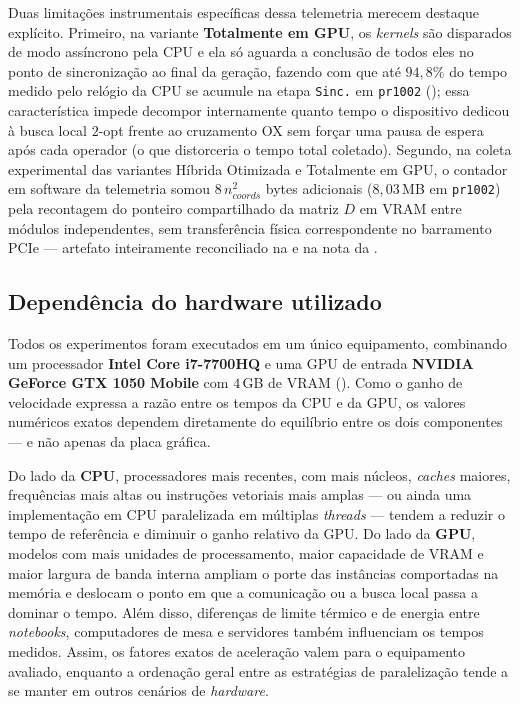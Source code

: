 Duas limitações instrumentais específicas dessa telemetria merecem destaque explícito.
Primeiro, na variante \textbf{Totalmente em GPU}, os \emph{kernels} são disparados de modo assíncrono pela CPU e ela só aguarda a conclusão de todos eles no ponto de sincronização ao final da geração, fazendo com que até \(94{,}8\%\) do tempo medido pelo relógio da CPU se acumule na etapa \texttt{Sinc.} em \texttt{pr1002} (); essa característica impede decompor internamente quanto tempo o dispositivo dedicou à busca local \(2\)-opt frente ao cruzamento OX sem forçar uma pausa de espera após cada operador (o que distorceria o tempo total coletado).
Segundo, na coleta experimental das variantes Híbrida Otimizada e Totalmente em GPU, o contador em software da telemetria somou \(8\,n_{coords}^2\) bytes adicionais (\(8{,}03\)\,MB em \texttt{pr1002}) pela recontagem do ponteiro compartilhado da matriz \(D\) em VRAM entre módulos independentes, sem transferência física correspondente no barramento PCIe --- artefato inteiramente reconciliado na  e na nota da .

\subsection{Dependência do hardware utilizado}\label{sec-533-hardware-unico}

Todos os experimentos foram executados em um único equipamento, combinando um processador \textbf{Intel Core i7-7700HQ} e uma GPU de entrada \textbf{NVIDIA GeForce GTX 1050 Mobile} com \(4\)\,GB de VRAM ().
Como o ganho de velocidade expressa a razão entre os tempos da CPU e da GPU, os valores numéricos exatos dependem diretamente do equilíbrio entre os dois componentes --- e não apenas da placa gráfica.

Do lado da \textbf{CPU}, processadores mais recentes, com mais núcleos, \emph{caches} maiores, frequências mais altas ou instruções vetoriais mais amplas --- ou ainda uma implementação em CPU paralelizada em múltiplas \emph{threads} --- tendem a reduzir o tempo de referência e diminuir o ganho relativo da GPU.
Do lado da \textbf{GPU}, modelos com mais unidades de processamento, maior capacidade de VRAM e maior largura de banda interna ampliam o porte das instâncias comportadas na memória e deslocam o ponto em que a comunicação ou a busca local passa a dominar o tempo.
Além disso, diferenças de limite térmico e de energia entre \emph{notebooks}, computadores de mesa e servidores também influenciam os tempos medidos.
Assim, os fatores exatos de aceleração valem para o equipamento avaliado, enquanto a ordenação geral entre as estratégias de paralelização tende a se manter em outros cenários de \emph{hardware}.

